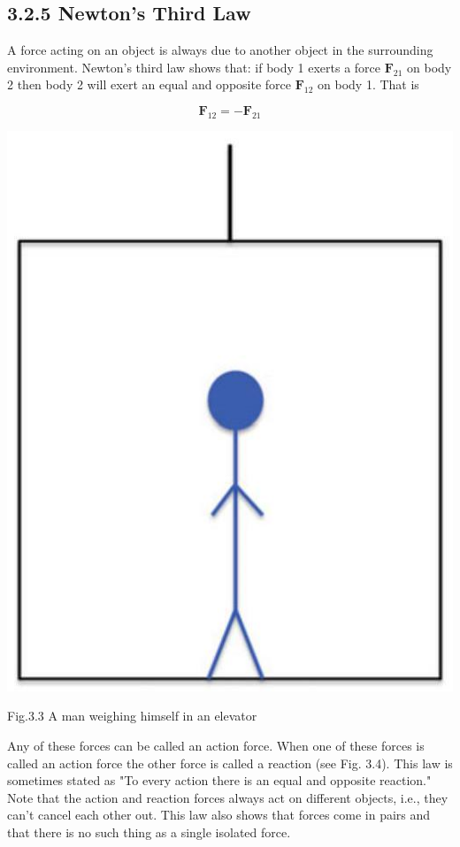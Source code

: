 \documentclass[10pt]{article}
\begin{document}
\subsection*{3.2.5 Newton's Third Law}
A force acting on an object is always due to another object in the surrounding environment. Newton's third law shows that: if body 1 exerts a force $\mathbf{F}_{21}$ on body 2 then body 2 will exert an equal and opposite force $\mathbf{F}_{12}$ on body 1. That is

$$
\mathbf{F}_{12}=-\mathbf{F}_{21}
$$

\begin{center}
\includegraphics[max width=\textwidth]{2024_09_13_db1f357d2aad0a03eb2eg-051}
\end{center}

Fig.3.3 A man weighing himself in an elevator

Any of these forces can be called an action force. When one of these forces is called an action force the other force is called a reaction (see Fig. 3.4). This law is sometimes stated as "To every action there is an equal and opposite reaction." Note that the action and reaction forces always act on different objects, i.e., they can't cancel each other out. This law also shows that forces come in pairs and that there is no such thing as a single isolated force.
\end{document}
